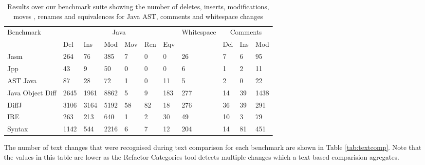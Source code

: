 \begin{table}[t!]
    \begin{tabular}{l|llllll|l|lll}
    Benchmark        & \multicolumn{6}{|c|}{Java}           & Whitespace & \multicolumn{3}{|c}{Comments} \\ \cline{2-7} \cline{9-11}
    ~                & Del  & Ins  & Mod  & Mov & Ren & Eqv & ~          & Del      & Ins & Mod  \\ \hline
    Jasm             & 264  & 76   & 385  & 7   & 0   & 0   & 26         & 7        & 6   & 95   \\
    Jpp              & 43   & 9    & 50   & 0   & 0   & 0   & 6          & 1        & 2   & 11   \\
    AST Java         & 87   & 28   & 72   & 1   & 0   & 11  & 5          & 2        & 0   & 22   \\
    Java Object Diff & 2645 & 1961 & 8862 & 5   & 9   & 183 & 277        & 14       & 39  & 1438 \\
    DiffJ            & 3106 & 3164 & 5192 & 58  & 82  & 18  & 276        & 36       & 39  & 291  \\
    IRE              & 263  & 213  & 640  & 1   & 2   & 30  & 49         & 10       & 3   & 79   \\
    Syntax           & 1142 & 544  & 2216 & 6   & 7   & 12  & 204        & 14       & 81  & 451  \\
    \end{tabular}
    \caption{Results over our benchmark suite showing the number of deletes, inserts, modifications, moves , renames and equivalences for Java AST, comments and whitespace changes}
    \label{tab:results}
\end{table}

The number of text changes that were recognised during text comparison for each benchmark are shown in Table \ref{tab:textcomp}. Note that the values in this table are lower as the Refactor Categories tool detects multiple changes which a text based comparision agregates.  

